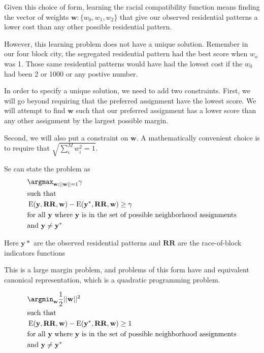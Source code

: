Given this choice of form, learning the racial compatibility function
means finding the vector of weights $\mathbf{w}: \{w_0, w_1, w_2\}$ that give our observed residential patterns a lower
cost than any other possible residential pattern.

However, this learning problem does not have a unique
solution. Remember in our four block city, the segregated residential
pattern had the best score when $w_o$ was 1. Those same residential
patterns would have had the lowest cost if the $w_0$ had been 2 or
1000 or any postive number.

In order to specify a unique solution, we need to add two
constraints. First, we will go beyond requiring that the preferred
assignment have the lowest score. We will attempt to find $\mathbf{w}$
such that our preferred assignment has a lower score than any other
assignment by the largest possible margin. 

Second, we will also put a constraint on $\mathbf{w}$. A
mathematically convenient choice is to require that $\sqrt{\sum_i^M w_i^2 = 1}$.

Se can state the problem as 
%
\begin{align*}
&\argmax_{\mathbf{w}:||\mathbf{w}||=1} \mathbf{\gamma} \\
&\text{such that} \\
&\operatorname{E}(\mathbf{y}, \mathbf{RR}, \mathbf{w})
- \operatorname{E}(\mathbf{y}^*, \mathbf{RR}, \mathbf{w}) \geq \gamma\\ 
&\text{for all } \mathbf{y} \text{ where } \mathbf{y} \text{ is in the set of
  possible neighborhood assignments}\\
&\text{and } \mathbf{y} \neq \mathbf{y}^*
\end{align*}
%

Here $\mathbf{y}*$ are the observed residential patterns and $\mathbf{RR}$
are the race-of-block indicators functions

This is a large margin problem, and problems of this form have and
equivalent canonical representation, which is a quadratic programming
problem.

%
\begin{align*}
&\argmin_{\mathbf{w}} \frac{1}{2}||\mathbf{w}||^2 \\
&\text{such that} \\
&\operatorname{E}(\mathbf{y}, \mathbf{RR}, \mathbf{w})
- \operatorname{E}(\mathbf{y}^*, \mathbf{RR}, \mathbf{w}) \geq 1 \\ 
&\text{for all } \mathbf{y} \text{ where } \mathbf{y} \text{ is in the set of
  possible neighborhood assignments}\\
&\text{and } \mathbf{y} \neq \mathbf{y}^*
\end{align*}


